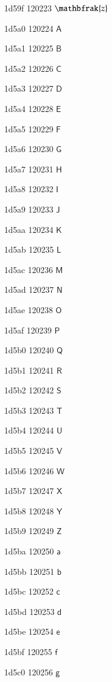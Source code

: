 \documentclass[11pt]{article}
\begin{document}
1d59f 120223 \ensuremath{\mathbfrak{z}}

1d5a0 120224 \ensuremath{\mathsf{A}}

1d5a1 120225 \ensuremath{\mathsf{B}}

1d5a2 120226 \ensuremath{\mathsf{C}}

1d5a3 120227 \ensuremath{\mathsf{D}}

1d5a4 120228 \ensuremath{\mathsf{E}}

1d5a5 120229 \ensuremath{\mathsf{F}}

1d5a6 120230 \ensuremath{\mathsf{G}}

1d5a7 120231 \ensuremath{\mathsf{H}}

1d5a8 120232 \ensuremath{\mathsf{I}}

1d5a9 120233 \ensuremath{\mathsf{J}}

1d5aa 120234 \ensuremath{\mathsf{K}}

1d5ab 120235 \ensuremath{\mathsf{L}}

1d5ac 120236 \ensuremath{\mathsf{M}}

1d5ad 120237 \ensuremath{\mathsf{N}}

1d5ae 120238 \ensuremath{\mathsf{O}}

1d5af 120239 \ensuremath{\mathsf{P}}

1d5b0 120240 \ensuremath{\mathsf{Q}}

1d5b1 120241 \ensuremath{\mathsf{R}}

1d5b2 120242 \ensuremath{\mathsf{S}}

1d5b3 120243 \ensuremath{\mathsf{T}}

1d5b4 120244 \ensuremath{\mathsf{U}}

1d5b5 120245 \ensuremath{\mathsf{V}}

1d5b6 120246 \ensuremath{\mathsf{W}}

1d5b7 120247 \ensuremath{\mathsf{X}}

1d5b8 120248 \ensuremath{\mathsf{Y}}

1d5b9 120249 \ensuremath{\mathsf{Z}}

1d5ba 120250 \ensuremath{\mathsf{a}}

1d5bb 120251 \ensuremath{\mathsf{b}}

1d5bc 120252 \ensuremath{\mathsf{c}}

1d5bd 120253 \ensuremath{\mathsf{d}}

1d5be 120254 \ensuremath{\mathsf{e}}

1d5bf 120255 \ensuremath{\mathsf{f}}

1d5c0 120256 \ensuremath{\mathsf{g}}
\end{document}
